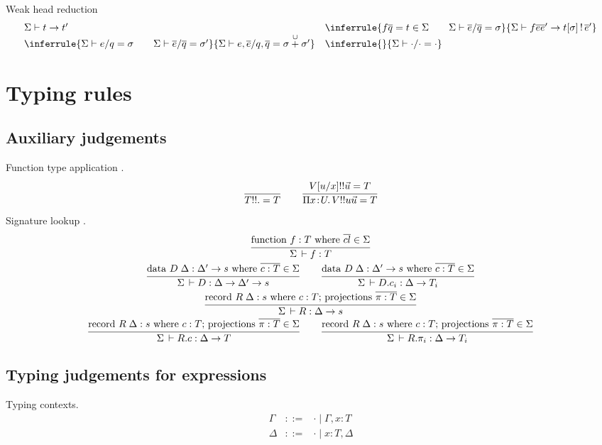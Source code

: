 \documentclass[acmlarge]{acmart}\settopmatter{}
\renewcommand{\|}{\mid}
\begin{document}
Weak head reduction
\[
\begin{array}{ll}
\Sigma \vdash t \to t' &
\inferrule{f \overline q = t \in \Sigma \qquad \Sigma \vdash \overline{e}/\overline{q} = \sigma}
{\Sigma \vdash f \overline{e} \overline{e}' \to t[\sigma] \bang \overline{e}'}
\\
\inferrule{\Sigma \vdash e/q = \sigma \qquad \Sigma \vdash \overline{e}/\overline{q} = \sigma'}
{\Sigma \vdash e, \overline{e}/q, \overline{q} = \sigma \overset{\cup}{+} \sigma'}%
&
\inferrule{}
{\Sigma \vdash \cdot/\cdot = \cdot} %
\end{array}
\]


\section{Typing rules}
\label{sec:typing}


\subsection{Auxiliary judgements}

Function type application .
\[
  \ru{}{T !! . = T}
\qquad
  \ru{\subst u x V !! \vec u = T
    }{\funT x U V !! u \vec u = T}
\]


Signature lookup .
\begin{gather*}
  \ru{\funsig \in \Sigma
    }{\Sigma \der f : T}
\\
  \ru{\datasig \in \Sigma
    }{\Sigma \der D : \Delta \to \Delta' \to s}
\qquad
  \ru{\datasig \in \Sigma
    }{\Sigma \der D.c_i : \Delta \to T_i}
\\
  \ru{\recsig \in \Sigma
    }{\Sigma \der R : \Delta \to s}
\\
  \ru{\recsig \in \Sigma
    }{\Sigma \der R.c : \Delta \to T}
\qquad
  \ru{\recsig \in \Sigma
    }{\Sigma \der R.\pi_i : \Delta \to T_i}
\end{gather*}




\subsection{Typing judgements for expressions}


Typing contexts.
\[
\begin{array}{lcl}
\Gamma & ::= & \cdot \| \Gamma, x:T \\
\Delta & ::= & \cdot \| x:T, \Delta
\end{array}
\]
\end{document}
